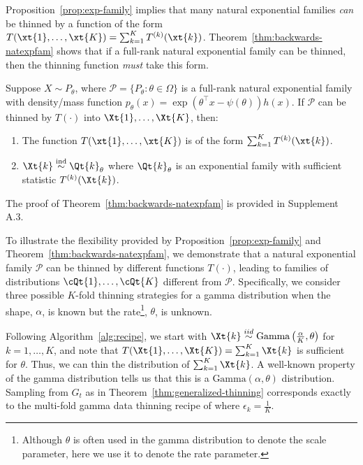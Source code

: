 \documentclass[12pt]{article}
\begin{document}
Proposition~\ref{prop:exp-family} implies that many natural exponential families \textit{can} be thinned by a function of the form $T(\xt{1},\dots,\xt{K})=\sum_{k=1}^K T^{(k)}(\xt{k})$. Theorem~\ref{thm:backwards-natexpfam} shows that if a full-rank natural exponential family can be thinned, then the thinning function \textit{must} take this form. 

\begin{theorem} \label{thm:backwards-natexpfam}
Suppose $X\sim P_\theta$, where $\mathcal{P}=\{P_\theta: \theta\in\Omega\}$ is a full-rank natural exponential family with density/mass function $p_\theta(x)=\exp(\theta^\top x - \psi(\theta))h(x)$. If $\mathcal{P}$ can be thinned by $T(\cdot)$ into $\Xt{1},\dots,\Xt{K}$, then:
\begin{enumerate}
    \item The function $T(\xt{1},\dots,\xt{K})$ is of the form $\sum_{k=1}^K T^{(k)}(\xt{k})$.
    \item $\Xt{k}\overset{\text{ind}}{\sim} \Qt{k}_\theta$ where $\Qt{k}_\theta$ is an exponential family with sufficient statistic $T^{(k)}(\Xt{k})$.
\end{enumerate}
\end{theorem}

The proof of Theorem~\ref{thm:backwards-natexpfam} is provided in Supplement A.3. 

To illustrate the flexibility provided by Proposition~\ref{prop:exp-family} and Theorem~\ref{thm:backwards-natexpfam}, we demonstrate that a natural exponential family $\mathcal P$ can be thinned by different functions $T(\cdot)$, leading to families of distributions $\cQt{1},\ldots,\cQt{K}$ different from $\mathcal P$. Specifically, we consider three possible $K$-fold thinning strategies for a gamma distribution when the shape, $\alpha$, is known but the rate\footnote{Although $\theta$ is often used in the gamma distribution to denote the scale parameter, here we use it to denote the rate parameter.}, $\theta$, is unknown.  

\begin{exmp} \label{ex:dtgamma} 
Following Algorithm~\ref{alg:recipe}, we start with $\Xt{k} \overset{iid}{\sim} \text{Gamma}\left(\frac{\alpha}{K},\theta\right)$ for $k=1,\ldots,K$, and note that $T(\Xt{1},\dots,\Xt{K})=\sum_{k=1}^K\Xt{k}$ is sufficient for $\theta$. Thus, we can thin the distribution of $\sum_{k=1}^K\Xt{k}$.  A well-known property of the gamma distribution tells us that this is a $\text{Gamma}(\alpha,\theta)$ distribution.  Sampling from $G_t$ as in Theorem~\ref{thm:generalized-thinning} 
corresponds exactly to the multi-fold gamma data thinning recipe of \cite{neufeld2023data} where $\epsilon_k=\frac{1}{K}$.
\end{exmp}
\end{document}

